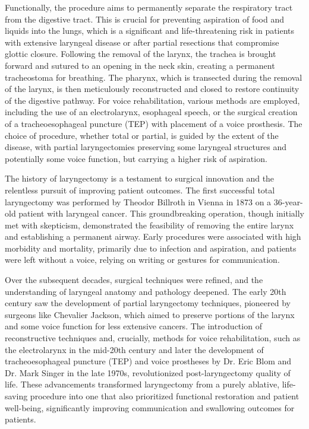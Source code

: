 Functionally, the procedure aims to permanently separate the respiratory tract from the digestive tract. This is crucial for preventing aspiration of food and liquids into the lungs, which is a significant and life-threatening risk in patients with extensive laryngeal disease or after partial resections that compromise glottic closure. Following the removal of the larynx, the trachea is brought forward and sutured to an opening in the neck skin, creating a permanent tracheostoma for breathing. The pharynx, which is transected during the removal of the larynx, is then meticulously reconstructed and closed to restore continuity of the digestive pathway. For voice rehabilitation, various methods are employed, including the use of an electrolarynx, esophageal speech, or the surgical creation of a tracheoesophageal puncture (TEP) with placement of a voice prosthesis. The choice of procedure, whether total or partial, is guided by the extent of the disease, with partial laryngectomies preserving some laryngeal structures and potentially some voice function, but carrying a higher risk of aspiration.

The history of laryngectomy is a testament to surgical innovation and the relentless pursuit of improving patient outcomes. The first successful total laryngectomy was performed by Theodor Billroth in Vienna in 1873 on a 36-year-old patient with laryngeal cancer. This groundbreaking operation, though initially met with skepticism, demonstrated the feasibility of removing the entire larynx and establishing a permanent airway. Early procedures were associated with high morbidity and mortality, primarily due to infection and aspiration, and patients were left without a voice, relying on writing or gestures for communication.

Over the subsequent decades, surgical techniques were refined, and the understanding of laryngeal anatomy and pathology deepened. The early 20th century saw the development of partial laryngectomy techniques, pioneered by surgeons like Chevalier Jackson, which aimed to preserve portions of the larynx and some voice function for less extensive cancers. The introduction of reconstructive techniques and, crucially, methods for voice rehabilitation, such as the electrolarynx in the mid-20th century and later the development of tracheoesophageal puncture (TEP) and voice prostheses by Dr. Eric Blom and Dr. Mark Singer in the late 1970s, revolutionized post-laryngectomy quality of life. These advancements transformed laryngectomy from a purely ablative, life-saving procedure into one that also prioritized functional restoration and patient well-being, significantly improving communication and swallowing outcomes for patients.


